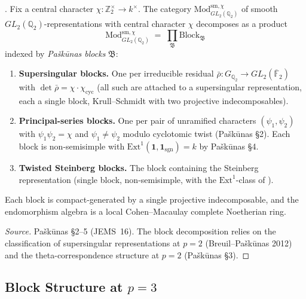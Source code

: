 \begin{theorem}[Pa{\v s}k{\=u}nas JEMS 16 (2014) block decomposition at \(p=2\)]
\label{v4-arith:w5-e:thm:Paskunas-p2}
\ClaimStatusProvedElsewhere. Fix a central character
\(\chi\colon\mathbb{Z}_{2}^{\times}\to k^{\times}\). The category
\(\mathrm{Mod}_{GL_{2}(\mathbb{Q}_{2})}^{\mathrm{sm},\chi}\) of smooth
\(GL_{2}(\mathbb{Q}_{2})\)-representations with central character
\(\chi\) decomposes as a product
\[
\mathrm{Mod}_{GL_{2}(\mathbb{Q}_{2})}^{\mathrm{sm},\chi}
\;=\;\prod_{\mathfrak{B}}\mathrm{Block}_{\mathfrak{B}}
\]
indexed by \emph{Pa{\v s}k{\=u}nas blocks} \(\mathfrak{B}\):
\begin{enumerate}
\item \textbf{Supersingular blocks.} One per irreducible residual
\(\bar\rho\colon G_{\mathbb{Q}_{2}}\to GL_{2}(\overline{\mathbb{F}}_{2})\)
with \(\det\bar\rho=\chi\cdot\chi_{\mathrm{cyc}}\) (all such are
attached to a supersingular representation, each a single block,
Krull--Schmidt with two projective indecomposables).
\item \textbf{Principal-series blocks.} One per pair of unramified
characters \((\psi_{1},\psi_{2})\) with \(\psi_{1}\psi_{2}=\chi\) and
\(\psi_{1}\neq\psi_{2}\) modulo cyclotomic twist (Pa{\v s}k{\=u}nas
\S 2). Each block is non-semisimple with
\(\mathrm{Ext}^{1}(\mathbf{1},\mathbf{1}_{\mathrm{sgn}})=k\) by
Pa{\v s}k{\=u}nas \S 4.
\item \textbf{Twisted Steinberg blocks.} The block containing the
Steinberg representation (single block, non-semisimple, with the
\(\mathrm{Ext}^{1}\)-class of
).
\end{enumerate}
Each block is compact-generated by a single projective
indecomposable, and the endomorphism algebra is a local
Cohen--Macaulay complete Noetherian ring.
\end{theorem}

\begin{proof}[Source]
Pa{\v s}k{\=u}nas \S 2--5 (JEMS~16). The block
decomposition relies on the classification of supersingular
representations at \(p=2\) (Breuil--Pa{\v s}k{\=u}nas 2012) and
the theta-correspondence structure at \(p=2\) (Pa{\v s}k{\=u}nas \S 3).
\end{proof}

\subsection{Block Structure at \(p=3\)}

